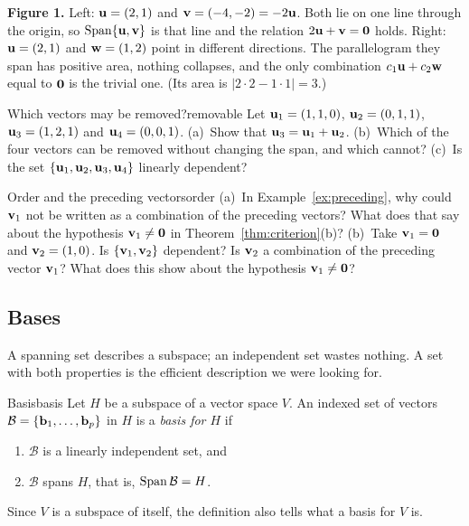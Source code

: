 \documentclass[11pt]{article}
\begin{document}
\textbf{Figure 1.} Left: $\mathbf{u}=(2,1)$ and $\mathbf{v}=(-4,-2)=-2\mathbf{u}$. Both lie on one line through the origin, so $\operatorname{Span}\{\mathbf{u},\mathbf{v}\}$ is that line and the relation $2\mathbf{u}+\mathbf{v}=\mathbf{0}$ holds. Right: $\mathbf{u}=(2,1)$ and $\mathbf{w}=(1,2)$ point in different directions. The parallelogram they span has positive area, nothing collapses, and the only combination $c_1\mathbf{u}+c_2\mathbf{w}$ equal to $\mathbf{0}$ is the trivial one. (Its area is $|2\cdot2-1\cdot1|=3$.)

\begin{kc}{Which vectors may be removed?}{removable}
Let $\mathbf{u}_1=(1,1,0)$, $\mathbf{u}_2=(0,1,1)$, $\mathbf{u}_3=(1,2,1)$ and $\mathbf{u}_4=(0,0,1)$. (a)~Show that $\mathbf{u}_3=\mathbf{u}_1+\mathbf{u}_2$. (b)~Which of the four vectors can be removed without changing the span, and which cannot? (c)~Is the set $\{\mathbf{u}_1,\mathbf{u}_2,\mathbf{u}_3,\mathbf{u}_4\}$ linearly dependent?
\end{kc}

\begin{think}{Order and the preceding vectors}{order}
(a)~In Example~\ref{ex:preceding}, why could $\mathbf{v}_1$ not be written as a combination of the preceding vectors? What does that say about the hypothesis $\mathbf{v}_1\neq\mathbf{0}$ in Theorem~\ref{thm:criterion}(b)? (b)~Take $\mathbf{v}_1=\mathbf{0}$ and $\mathbf{v}_2=(1,0)$. Is $\{\mathbf{v}_1,\mathbf{v}_2\}$ dependent? Is $\mathbf{v}_2$ a combination of the preceding vector $\mathbf{v}_1$? What does this show about the hypothesis $\mathbf{v}_1\neq\mathbf{0}$?
\end{think}

\subsection*{Bases}

A spanning set describes a subspace; an independent set wastes nothing. A set with both properties is the efficient description we were looking for.

\begin{defn}{Basis}{basis}
Let $H$ be a subspace of a vector space $V$. An indexed set of vectors $\mathcal{B}=\{\mathbf{b}_1,\dots,\mathbf{b}_p\}$ in $H$ is a \emph{basis for $H$} if
\begin{enumerate}[label=(\roman*),itemsep=1pt]
  \item $\mathcal{B}$ is a linearly independent set, and
  \item $\mathcal{B}$ spans $H$, that is, $\operatorname{Span}\mathcal{B}=H$.
\end{enumerate}
Since $V$ is a subspace of itself, the definition also tells what a basis for $V$ is.
\end{defn}
\end{document}
